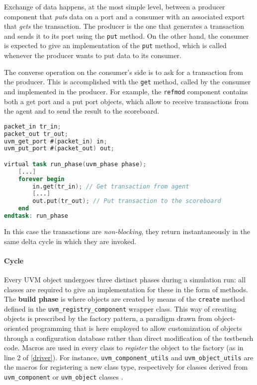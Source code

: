 Exchange of data happens, at the most simple level, between a producer component that \textit{puts} data on a port and a consumer with an associated export that \textit{gets} the transaction. The producer is the one that generates a transaction and sends it to its port using the \texttt{put} method. On the other hand, the consumer is expected to give an implementation of the \texttt{put} method, which is called whenever the producer wants to put data to its consumer.

The converse operation on the consumer's side is to ask for a transaction from the producer. This is accomplished with the \texttt{get} method, called by the consumer and implemented in the producer.
For example, the \texttt{refmod} component contains both a get port and a put port objects, which allow to receive transactions from the agent and to send the result to the scoreboard.

\begin{lstlisting}[language = verilog, caption = Snippet from \textit{refmod.sv}]
packet_in tr_in;
packet_out tr_out;
uvm_get_port #(packet_in) in;
uvm_put_port #(packet_out) out;

virtual task run_phase(uvm_phase phase);
	[...]
	forever begin
		in.get(tr_in); // Get transaction from agent
		[...]
		out.put(tr_out); // Put transaction to the scoreboard
	end
endtask: run_phase
\end{lstlisting}

In this case the transactions are \textit{non-blocking}, they return instantaneously in the same delta cycle in which they are invoked.

\paragraph{Cycle} Every UVM object undergoes three distinct phases during a simulation run: all classes are required to give an implementation for these in the form of methods.
The \textbf{build phase} is where objects are created by means of the \texttt{create} method defined in the \texttt{uvm\_registry\_component} wrapper class. This way of creating objects is prescribed by the factory pattern, a paradigm drawn from object-oriented programming that is here employed to allow customization of objects through a configuration database rather than direct modification of the testbench code. Macros are used in every class to \textit{register} the object to the factory (as in line 2 of \ref{driver}). For instance, \texttt{uvm\_component\_utils} and \texttt{uvm\_object\_utils} are the macros for registering a new class type, respectively for classes derived from \texttt{uvm\_component} or \texttt{uvm\_object} classes \cite{sistenix} .

